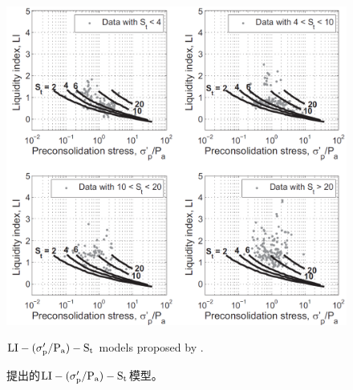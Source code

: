 \begin{figure}[!p]
\begin{minipage}[t]{0.48\textwidth}
        \includegraphics[width=\textwidth]{figures/figure-5.png}
        \caption{$\rm{LI}-(\sigma_p'/P_a)-S_t$ models proposed by \citet{NAVFAC1982}.}
        \vspace{-5pt}
        \addtocounter{figure}{-1}
        \renewcommand{\figurename}{图}
        \caption{\citet{NAVFAC1982}提出的$\rm{LI}-(\sigma_p'/P_a)-S_t$模型。}
        \label{figure:5}
        \renewcommand{\figurename}{Figure}
    \end{minipage}
\end{figure}

